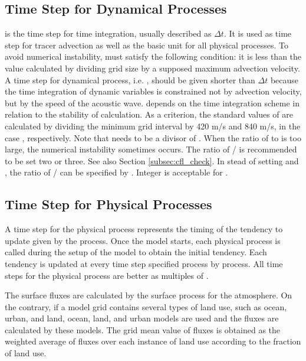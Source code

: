 \subsection{Time Step for Dynamical Processes}

 is the time step for time integration, usually described as $\Delta t$.
It is used as time step for tracer advection as well as the basic unit for all physical processes.
To avoid numerical instability,  must satisfy the following condition:
it is less than the value calculated by dividing grid size by a supposed maximum advection velocity.
A time step for dynamical process, i.e. , should be given shorter than $\Delta t$
because the time integration of dynamic variables is constrained not by advection velocity, but by the speed of the acoustic wave.
 depends on the time integration scheme in relation to the stability of calculation.
As a criterion, the standard values of  are calculated by dividing the minimum grid interval by 420 m/s and 840 m/s, in the case , respectively.
Note that  needs to be a divisor of .
When the ratio of  to  is too large,
the numerical instability sometimes occurs.
The ratio of / is recommended to be set two or three.
See also Section \ref{subsec:cfl_check}.
In stead of setting  and ,
the ratio of / can be specified by .
Integer is acceptable for .


\subsection{Time Step for Physical Processes}
A time step for the physical process represents the timing of the tendency to update given by the process. Once the model starts, each physical process is called during the setup of the model to obtain the initial tendency. Each tendency is updated at every time step specified process by process.
All time steps for the physical process are better as multiples of .

The surface fluxes are calculated by the surface process for the atmosphere.
On the contrary, if a model grid contains several types of land use, such as ocean, urban, and land,
ocean, land, and urban models are used and the fluxes are calculated by these models.
The grid mean value of fluxes is obtained as the weighted average of fluxes over each instance of land use according to the fraction of land use.

